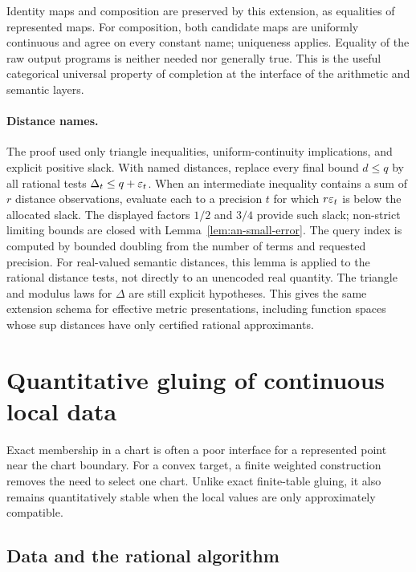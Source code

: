 Identity maps and composition are preserved by this extension, as
equalities of represented maps.  For composition, both candidate maps
are uniformly continuous and agree on every constant name; uniqueness
applies.  Equality of the raw output programs is neither needed nor
generally true.  This is the useful categorical universal property of
completion at the interface of the arithmetic and semantic layers.

\paragraph{Distance names.}
The proof used only triangle inequalities, uniform-continuity
implications, and explicit positive slack.  With named distances,
replace every final bound $d\le q$ by all rational tests
$\Delta_t\le q+\varepsilon_t$.  When an intermediate inequality contains a
sum of $r$ distance observations, evaluate each to a precision $t$ for
which $r\varepsilon_t$ is below the allocated slack.  The displayed factors
$1/2$ and $3/4$ provide such slack; non-strict limiting bounds are
closed with Lemma~\ref{lem:an-small-error}.  The query index is computed
by bounded doubling from the number of terms and requested precision.
For real-valued semantic distances, this lemma is applied to the
rational distance tests, not directly to an unencoded real quantity.
The triangle and modulus laws for $\Delta$ are still explicit
hypotheses.  This gives the same extension schema for effective metric
presentations, including function spaces whose sup distances have only
certified rational approximants.

\section{Quantitative gluing of continuous local data}
\label{sec:analytic-gluing}

Exact membership in a chart is often a poor interface for a represented
point near the chart boundary.  For a convex target, a finite weighted
construction removes the need to select one chart.  Unlike exact
finite-table gluing, it also remains quantitatively stable when the
local values are only approximately compatible.

\subsection{Data and the rational algorithm}

